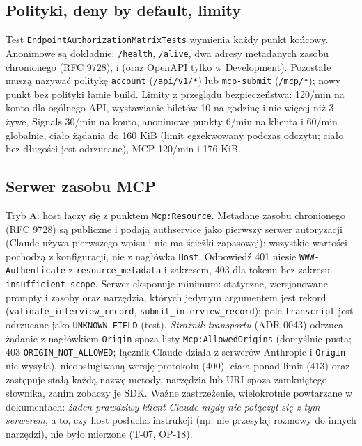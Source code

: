 \subsection{Polityki, deny by default, limity}

Test \texttt{EndpointAuthorizationMatrixTests} wymienia każdy punkt końcowy.
Anonimowe są dokładnie: \texttt{/health}, \texttt{/alive}, dwa adresy metadanych
zasobu chronionego (RFC 9728),  i
 (oraz OpenAPI tylko w Development). Pozostałe muszą
nazywać politykę \texttt{account} (\texttt{/api/v1/*}) lub \texttt{mcp-submit}
(\texttt{/mcp/*}); nowy punkt bez polityki łamie build. Limity z przeglądu
bezpieczeństwa: 120/min na konto dla ogólnego API, wystawianie biletów 10 na godzinę i
nie więcej niż 3 żywe, Signals 30/min na konto, anonimowe punkty 6/min na klienta i
60/min globalnie, ciało żądania do 160 KiB (limit egzekwowany podczas odczytu; ciało bez
długości jest odrzucane), MCP 120/min i 176 KiB.

\subsection{Serwer zasobu MCP}

Tryb A: host łączy się z punktem \texttt{Mcp:Resource}. Metadane zasobu chronionego
(RFC 9728) są publiczne i podają authservice jako pierwszy serwer autoryzacji
(Claude używa pierwszego wpisu i nie ma ścieżki zapasowej); wszystkie wartości
pochodzą z konfiguracji, nie z nagłówka \texttt{Host}. Odpowiedź 401 niesie
\texttt{WWW-Authenticate} z \texttt{resource\_metadata} i zakresem, 403 dla tokenu
bez zakresu --- \texttt{insufficient\_scope}. Serwer eksponuje minimum:
statyczne, wersjonowane prompty i zasoby oraz narzędzia, których jedynym
argumentem jest rekord (\texttt{validate\_interview\_record},
\texttt{submit\_interview\_record}); pole \texttt{transcript} jest odrzucane jako
\texttt{UNKNOWN\_FIELD} (test). \emph{Strażnik transportu} (ADR-0043) odrzuca żądanie z
nagłówkiem \texttt{Origin} spoza listy \texttt{Mcp:AllowedOrigins} (domyślnie pusta;
403 \texttt{ORIGIN\_NOT\_ALLOWED}; łącznik Claude działa z serwerów Anthropic i
\texttt{Origin} nie wysyła), nieobsługiwaną wersję protokołu (400), ciała ponad
limit (413) oraz zastępuje stałą każdą nazwę metody, narzędzia lub URI spoza
zamkniętego słownika, zanim zobaczy je SDK. Ważne zastrzeżenie, wielokrotnie
powtarzane w dokumentach: \emph{żaden prawdziwy klient Claude nigdy nie połączył się z tym
serwerem}, a to, czy host posłucha instrukcji (np. nie przesyłaj rozmowy do innych
narzędzi), nie było mierzone (T-07, OP-18).

